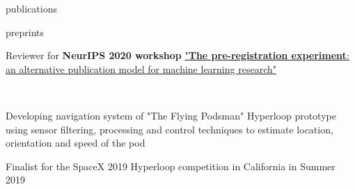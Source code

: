 \documentclass[]{lukas-cv-openfont}
\begin{document}
\noindent
{}
\vspace{-1.4em}
\begin{btSect}{publications}
\btPrintNotCited
\end{btSect}
\largesectionsep

\noindent
{}
\vspace{-1.4em}
\begin{btSect}{preprints}
\btPrintNotCited
\end{btSect}
\sectionsep


\noindent
\begin{tightitemize}{1.0em}
\item Reviewer for \textbf{NeurIPS 2020 workshop} \href{https://preregister.science/}{"\textbf{The pre-registration experiment}: an alternative publication model for machine learning research"}
\end{tightitemize}
\sectionsep



\noindent
{}
\\
\begin{tightitemize}{1.7em}
    \item Developing navigation system of "The Flying Podsman" Hyperloop prototype using sensor filtering, processing and control techniques to estimate location, orientation and speed of the pod
    \item Finalist for the SpaceX 2019 Hyperloop competition in California in Summer 2019
\end{tightitemize}
\largesectionsep

\end{document}
